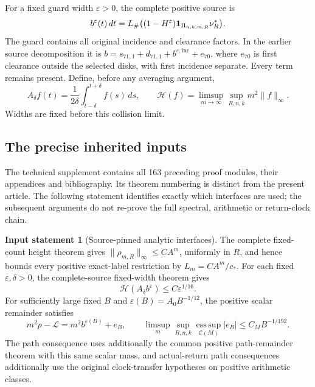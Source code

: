 \documentclass[11pt,reqno]{amsart}
\numberwithin{equation}{section}
\theoremstyle{definition}\newtheorem{definition}[theorem]{Definition}
\theoremstyle{remark}\newtheorem{remark}[theorem]{Remark}
\theoremstyle{definition}\newtheorem{inputstatement}[theorem]{Input statement}
\newcommand{\esssup}{\operatorname*{ess\,sup}}
\begin{document}
For a fixed guard width $\varepsilon>0$, the complete positive
source is
\begin{equation}\label{eq:v74-full-source}
 b^\varepsilon(t)\,dt
  =L_\#\bigl((1-H^\varepsilon)\one_{\Pi_{n,k,m,R}}\nu_R^*\bigr).
\end{equation}
The guard contains all original incidence and clearance factors.
In the earlier source decomposition it is
$b=s_{71,1}+d_{71,1}+b^{\varepsilon,\mathrm{inc}}+e_{70}$,
where $e_{70}$ is first clearance outside the selected disks,
with first incidence separate. Every term remains present.
Define, before any averaging argument,
\[
 A_\delta f(t)=\frac1{2\delta}\int_{t-\delta}^{t+\delta}f(s)\,ds,
 \qquad
 \mathcal H(f)=\limsup_{m\to\infty}\sup_{R,n,k}m^2\|f\|_\infty.
\]
Widths are fixed before this collision limit.

\subsection{The precise inherited inputs}
The technical supplement contains all 163 preceding proof modules,
their appendices and bibliography. Its theorem numbering is distinct
from the present article. The following statement identifies exactly
which interfaces are used; the subsequent arguments do not re-prove
the full spectral, arithmetic or return-clock chain.

\begin{inputstatement}[Source-pinned analytic interfaces]
\label{input:v74-dependencies}
The complete fixed-count height theorem gives
$\|\rho_{m,R}\|_\infty\le CA^m$, uniformly in $R$, and hence bounds
every positive exact-label restriction by $L_m=CA^m/c_*$.
For each fixed $\varepsilon,\delta>0$, the complete-source
fixed-width theorem gives
\begin{equation}\label{eq:v74-average-input}
                    \mathcal H(A_\delta b^\varepsilon)
                                         \le C\varepsilon^{1/16}.
\end{equation}
For sufficiently large fixed $B$ and
$\varepsilon(B)=A_0B^{-1/12}$, the positive scalar remainder satisfies
\begin{equation}\label{eq:v74-positive-input}
 m^2p-\mathcal L=m^2b^{\varepsilon(B)}+e_B,
 \qquad \limsup_m\sup_{R,n,k}\esssup_{\mathcal C(M)}|e_B|
                                              \le C_MB^{-1/192}.
\end{equation}
The path consequence uses additionally the common positive
path-remainder theorem with this same scalar mass, and actual-return
path consequences additionally use the original clock-transfer
hypotheses on positive arithmetic classes.
\end{inputstatement}
\end{document}

